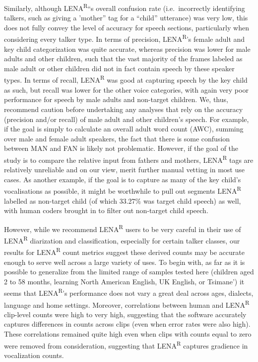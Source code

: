 \documentclass[english,table,man,floatsintext]{apa6}
\begin{document}
Similarly, although LENA\textsuperscript{R}\enquote{s overall confusion rate (i.e.~incorrectly identifying talkers, such as giving a 'mother} tag for a \enquote{child} utterance) was very low, this does not fully convey the level of accuracy for speech sections, particularly when considering every talker type. In terms of precision, LENA\textsuperscript{R}'s female adult and key child categorization was quite accurate, whereas precision was lower for male adults and other children, such that the vast majority of the frames labeled as male adult or other children did not in fact contain speech by these speaker types. In terms of recall, LENA\textsuperscript{R} was good at capturing speech by the key child as such, but recall was lower for the other voice categories, with again very poor performance for speech by male adults and non-target children. We, thus, recommend caution before undertaking any analyses that rely on the accuracy (precision and/or recall) of male adult and other children's speech. For example, if the goal is simply to calculate an overall adult word count (AWC), summing over male and female adult speakers, the fact that there is some confusion between MAN and FAN is likely not problematic. However, if the goal of the study is to compare the relative input from fathers and mothers, LENA\textsuperscript{R} tags are relatively unreliable and on our view, merit further manual vetting in most use cases. As another example, if the goal is to capture as many of the key child's vocalisations as possible, it might be worthwhile to pull out segments LENA\textsuperscript{R} labelled as non-target child (of which 33.27\% was target child speech) as well, with human coders brought in to filter out non-target child speech.

However, while we recommend LENA\textsuperscript{R} users to be very careful in their use of LENA\textsuperscript{R} diarization and classification, especially for certain talker classes, our results for LENA\textsuperscript{R} count metrics suggest these derived counts may be accurate enough to serve well across a large variety of uses. To begin with, as far as it is possible to generalize from the limited range of samples tested here (children aged 2 to 58 months, learning North American English, UK English, or Tsimane') it seems that LENA\textsuperscript{R}'s performance does not vary a great deal across ages, dialects, language and home settings. Moreover, correlations between human and LENA\textsuperscript{R} clip-level counts were high to very high, suggesting that the software accurately captures differences in counts across clips (even when error rates were also high). These correlations remained quite high even when clips with counts equal to zero were removed from consideration, suggesting that LENA\textsuperscript{R} captures gradience in vocalization counts.
\end{document}
